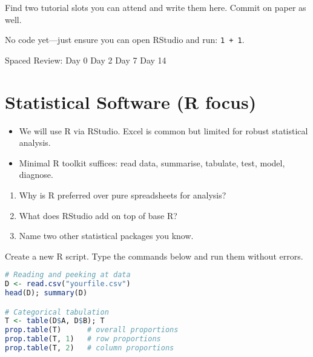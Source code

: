 \documentclass[11pt,a4paper]{article}
\def\textbf#1{#1}%
\newcommand{\reviewticks}{
  \vspace{0.4em}
  \noindent\scriptsize\textbf{Spaced Review:}
  \fbox{\phantom{D0}} Day 0\quad
  \fbox{\phantom{D2}} Day 2\quad
  \fbox{\phantom{D7}} Day 7\quad
  \fbox{\phantom{D14}} Day 14
}
\begin{document}
\begin{practicebox}
Find two tutorial slots you can attend and write them here. Commit on paper as well.
\end{practicebox}

\begin{rbox}
No code yet—just ensure you can open RStudio and run: \texttt{1 + 1}.
\end{rbox}

\reviewticks

\section{Statistical Software (R focus)}

\begin{corebox}
\begin{itemize}
  \item We will use \textbf{R} via RStudio. Excel is common but limited for robust statistical analysis.
  \item Minimal R toolkit suffices: read data, summarise, tabulate, test, model, diagnose.
\end{itemize}
\end{corebox}

\begin{recallbox}
\begin{enumerate}
  \item Why is R preferred over pure spreadsheets for analysis?
  \item What does RStudio add on top of base R?
  \item Name two other statistical packages you know.
\end{enumerate}
\end{recallbox}

\begin{practicebox}
Create a new R script. Type the commands below and run them without errors.
\end{practicebox}

\begin{rbox}
\begin{lstlisting}[language=R]
# Reading and peeking at data
D <- read.csv("yourfile.csv")
head(D); summary(D)

# Categorical tabulation
T <- table(D$A, D$B); T
prop.table(T)      # overall proportions
prop.table(T, 1)   # row proportions
prop.table(T, 2)   # column proportions
\end{lstlisting}
\end{rbox}
\end{document}
